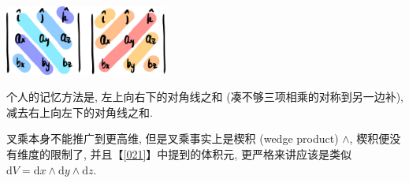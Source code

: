 \begin{tcolorbox}[size=fbox, breakable, enhanced jigsaw]
  \includegraphics[width=0.4\textwidth]{img/image-20240104090600239.png}
\end{tcolorbox}

\begin{newquote}
个人的记忆方法是, 左上向右下的对角线之和
(凑不够三项相乘的对称到另一边补), 减去右上向左下的对角线之和.
\end{newquote}

叉乘本身不能推广到更高维, 但是叉乘事实上是楔积 (wedge product)
\(\wedge\), 楔积便没有维度的限制了, 并且【\ref{021}】中提到的体积元,
更严格来讲应该是类似
\(\mathrm{d}V=\mathrm{d}x\wedge\mathrm{d}y\wedge\mathrm{d}z\).

